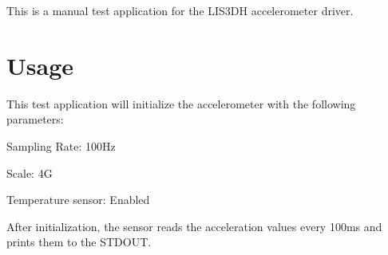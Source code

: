 This is a manual test application for the L\+I\+S3\+DH accelerometer driver.

\section*{Usage}

This test application will initialize the accelerometer with the following parameters\+:
\begin{DoxyItemize}
\item Sampling Rate\+: 100\+Hz
\item Scale\+: 4G
\item Temperature sensor\+: Enabled
\end{DoxyItemize}

After initialization, the sensor reads the acceleration values every 100ms and prints them to the S\+T\+D\+O\+UT. 